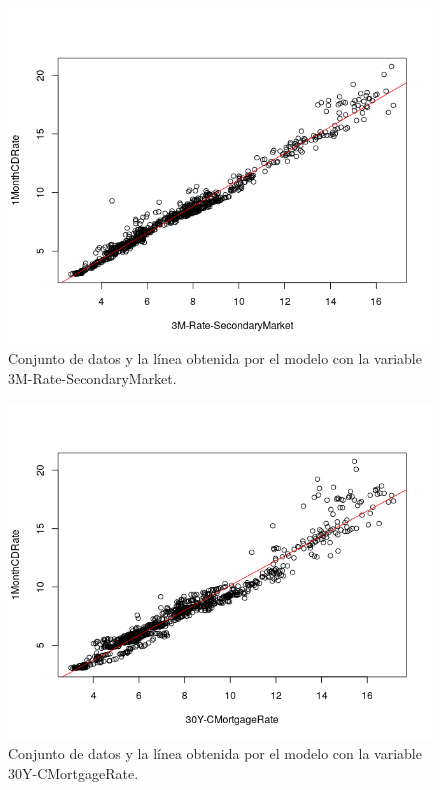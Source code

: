 \documentclass[12pt,a4paper]{article}
\begin{document}
\begin{figure}[H]
	\centering 
	\includegraphics[scale=0.65]{./Imagenes/Regresion/abline_3M_Rate_SecondaryMarket.png}
	\caption{Conjunto de datos y la línea obtenida por el modelo con la variable 3M-Rate-SecondaryMarket.}
\end{figure}

\begin{figure}[H]
	\centering 
	\includegraphics[scale=0.65]{./Imagenes/Regresion/abline_30Y_CMortgageRate.png}
	\caption{Conjunto de datos y la línea obtenida por el modelo con la variable 30Y-CMortgageRate.}
\end{figure}
\end{document}
